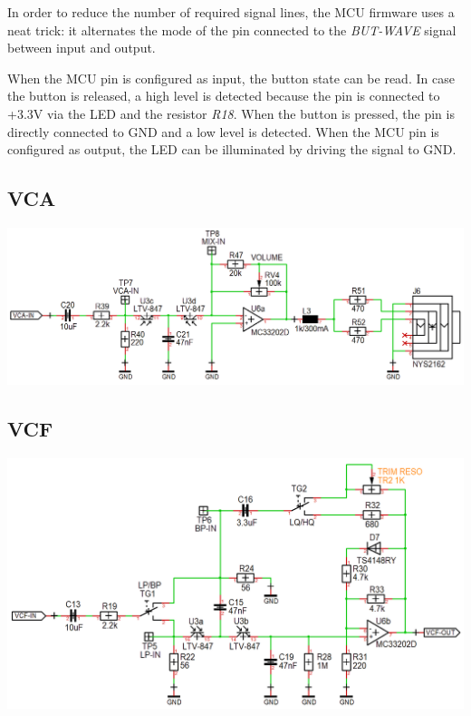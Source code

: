 \documentclass{scrartcl}
\begin{document}
In order to reduce the number of required signal lines, the MCU firmware uses a neat trick: it alternates the mode of the pin connected to the \emph{BUT-WAVE} signal between input and output.

When the MCU pin is configured as input, the button state can be read. In case the button is released, a high level is detected because the pin is connected to +3.3V via the LED and the resistor \emph{R18}. When the button is pressed, the pin is directly connected to GND and a low level is detected. When the MCU pin is configured as output, the LED can be illuminated by driving the signal to GND.

\subsection{VCA}

\begin{center}
    \includegraphics[scale=0.37]{assets/schema-vca.png}
\end{center}

\subsection{VCF}

\begin{center}
    \includegraphics[scale=0.39]{assets/schema-vcf.png}
\end{center}
\end{document}
